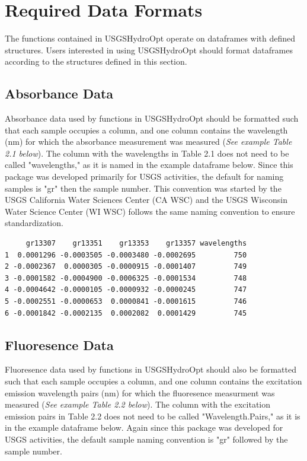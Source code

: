 \documentclass[a4paper,11pt]{article}\usepackage[]{graphicx}\usepackage[]{color}
\makeatletter
\newenvironment{kframe}{%
 \def\at@end@of@kframe{}%
 \ifinner\ifhmode%
  \def\at@end@of@kframe{\end{minipage}}%
  \begin{minipage}{\columnwidth}%
 \fi\fi%
 \def\FrameCommand##1{\hskip\@totalleftmargin \hskip-\fboxsep
 \colorbox{shadecolor}{##1}\hskip-\fboxsep
     \hskip-\linewidth \hskip-\@totalleftmargin \hskip\columnwidth}%
 \MakeFramed {\advance\hsize-\width
   \@totalleftmargin\z@ \linewidth\hsize
   \@setminipage}}%
 {\par\unskip\endMakeFramed%
 \at@end@of@kframe}
\newenvironment{knitrout}{}{} %
\makeatother
\begin{document}
\section{Required Data Formats}
The functions contained in USGSHydroOpt operate on dataframes with defined structures. Users interested in using USGSHydroOpt should format dataframes according to the structures defined in this section.

\subsection{Absorbance Data}
Absorbance data used by functions in USGSHydroOpt should be formatted such that each sample occupies a column, and one column contains the wavelength (nm) for which the absorbance measurement was measured (\emph{See example Table 2.1 below}). The column with the wavelengths in Table 2.1 does not need to be called "wavelengths," as it is named in the example dataframe below. Since this package was developed primarily for USGS activities, the default for naming samples is "gr" then the sample number. This convention was started by the USGS California Water Sciences Center (CA WSC) and the USGS Wisconsin Water Science Center (WI WSC) follows the same naming convention to ensure standardization.

\begin{knitrout}
\color{fgcolor}\begin{kframe}
\begin{verbatim}
     gr13307    gr13351    gr13353    gr13357 wavelengths
1  0.0001296 -0.0003505 -0.0003480 -0.0002695         750
2 -0.0002367  0.0000305 -0.0000915 -0.0001407         749
3 -0.0001582 -0.0004900 -0.0006325 -0.0001534         748
4 -0.0004642 -0.0000105 -0.0000932 -0.0000245         747
5 -0.0002551 -0.0000653  0.0000841 -0.0001615         746
6 -0.0001842 -0.0002135  0.0002082  0.0001429         745
\end{verbatim}
\end{kframe}
\end{knitrout}

\subsection{Fluoresence Data}
Fluoresence data used by functions in USGSHydroOpt should also be formatted such that each sample occupies a column, and one column contains the excitation emission wavelength pairs (nm) for which the fluoresence measurment was measured (\emph{See example Table 2.2 below}). The column with the excitation emission pairs in Table 2.2 does not need to be called "Wavelength.Pairs," as it is in the example dataframe below. Again since this package was developed for USGS activities, the default sample naming convention is "gr" followed by the sample number.
\end{document}
